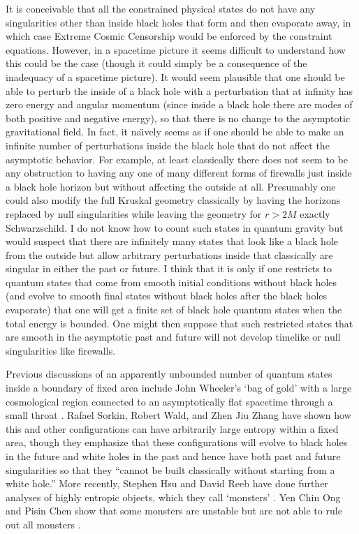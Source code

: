 \documentclass[12pt]{article}
\begin{document}
It is conceivable that all the constrained physical states do not have any singularities other than inside black holes that form and then evaporate away, in which case Extreme Cosmic Censorship would be enforced by the constraint equations.  However, in a spacetime picture it seems difficult to understand how this could be the case (though it could simply be a consequence of the inadequacy of a spacetime picture).  It would seem plausible that one should be able to perturb the inside of a black hole with a perturbation that at infinity has zero energy and angular momentum (since inside a black hole there are modes of both positive and negative energy), so that there is no change to the asymptotic gravitational field.  In fact, it na\"{\i}vely seems as if one should be able to make an infinite number of perturbations inside the black hole that do not affect the asymptotic behavior.  For example, at least classically there does not seem to be any obstruction to having any one of many different forms of firewalls just inside a black hole horizon but without affecting the outside at all.  Presumably one could also modify the full Kruskal geometry classically by having the horizons replaced by null singularities while leaving the geometry for $r > 2M$ exactly Schwarzschild.  I do not know how to count such states in quantum gravity but would suspect that there are infinitely many states that look like a black hole from the outside but allow arbitrary perturbations inside that classically are singular in either the past or future.  I think that it is only if one restricts to quantum states that come from smooth initial conditions without black holes (and evolve to smooth final states without black holes after the black holes evaporate) that one will get a finite set of black hole quantum states when the total energy is bounded.  One might then suppose that such restricted states that are smooth in the asymptotic past and future will not develop timelike or null singularities like firewalls.

Previous discussions of an apparently unbounded number of quantum states inside a boundary of fixed area include John Wheeler's `bag of gold' with a large cosmological region connected to an asymptotically flat spacetime through a small throat \cite{Wheeler}.  Rafael Sorkin, Robert Wald, and Zhen Jiu Zhang \cite{Sorkin:1981wd} have shown how this and other configurations can have arbitrarily large entropy within a fixed area, though they emphasize that these configurations will evolve to black holes in the future and white holes in the past and hence have both past and future singularities so that they ``cannot be built classically without starting from a white hole.''  More recently, Stephen Hsu and David Reeb have done further analyses of highly entropic objects, which they call `monsters' \cite{Hsu:2007dr,Hsu:2008yi,Hsu:2009kv}.  Yen Chin Ong and Pisin Chen show that some monsters are unstable but are not able to rule out all monsters \cite{Ong:2013mba}.
\end{document}
